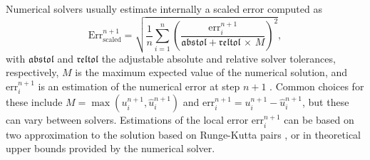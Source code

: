 
Numerical solvers usually estimate internally a scaled error computed as 
\begin{equation}
    \text{Err}_\text{scaled}^{n+1}
    =
    \sqrt{
    \frac{1}{n} \sum_{i=1}^n \left( \frac{\text{err}_i^{n+1}}{\mathfrak{abstol} + \mathfrak{reltol} \, \times \, M} \right)^2 },
    \label{eq:internal-norm-wrong}
\end{equation}
with $\mathfrak{abstol}$ and $\mathfrak{reltol}$ the adjustable absolute and relative solver tolerances, respectively, $M$ is the maximum expected value of the numerical solution, and $\text{err}_i^{n+1}$ is an estimation of the numerical error at step $n+1$ \cite{hairer-solving-1, Rackauckas_Nie_2016}. 
Common choices for these include $M = \max (u_i^{n+1}, \hat u_i^{n+1})$ and $\text{err}_i^{n+1} = u_i^{n+1} - \hat u_i^{n+1}$, but these can vary between solvers. 
Estimations of the local error $\text{err}_i^{n+1}$ can be based on two approximation to the solution based on Runge-Kutta pairs   \cite{Ranocha_Dalcin_Parsani_Ketcheson_2022, hairer-solving-1}, or in theoretical upper bounds provided by the numerical solver. 


